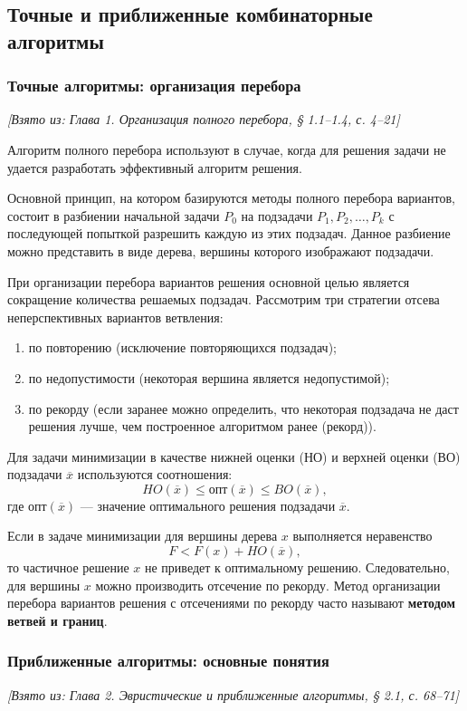 \documentclass[a4paper,12pt]{article}
\begin{document}
\subsection{Точные и приближенные комбинаторные алгоритмы}

\subsubsection*{Точные алгоритмы: организация перебора}
\textit{[Взято из: Глава 1. Организация полного перебора, § 1.1–1.4, с. 4–21]}

Алгоритм полного перебора используют в случае, когда для решения задачи не удается разработать эффективный алгоритм решения.

Основной принцип, на котором базируются методы полного перебора вариантов, состоит в разбиении начальной задачи \(P_0\) на подзадачи \(P_1, P_2, \dots, P_k\) с последующей попыткой разрешить каждую из этих подзадач. Данное разбиение можно представить в виде дерева, вершины которого изображают подзадачи.

При организации перебора вариантов решения основной целью является сокращение количества решаемых подзадач. Рассмотрим три стратегии отсева неперспективных вариантов ветвления:
\begin{enumerate}
    \item по повторению (исключение повторяющихся подзадач);
    \item по недопустимости (некоторая вершина является недопустимой);
    \item по рекорду (если заранее можно определить, что некоторая подзадача не даст решения лучше, чем построенное алгоритмом ранее (рекорд)).
\end{enumerate}

Для задачи минимизации в качестве нижней оценки (НО) и верхней оценки (ВО) подзадачи \(\overline{x}\) используются соотношения:
\[
HO(\overline{x}) \le \text{опт}(\overline{x}) \le BO(\overline{x}),
\]
где \(\text{опт}(\overline{x})\) --- значение оптимального решения подзадачи \(\overline{x}\).

Если в задаче минимизации для вершины дерева \(x\) выполняется неравенство
\[
F < F(x) + HO(\overline{x}),
\]
то частичное решение \(x\) не приведет к оптимальному решению. Следовательно, для вершины \(x\) можно производить отсечение по рекорду. Метод организации перебора вариантов решения с отсечениями по рекорду часто называют \textbf{методом ветвей и границ}.

\subsubsection*{Приближенные алгоритмы: основные понятия}
\textit{[Взято из: Глава 2. Эвристические и приближенные алгоритмы, § 2.1, с. 68–71]}
\end{document}
